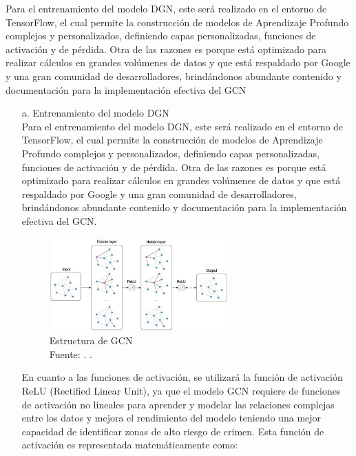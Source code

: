 Para el entrenamiento del modelo DGN, este será realizado en el entorno de TensorFlow, el cual permite la construcción de modelos de Aprendizaje Profundo complejos y personalizados, definiendo capas personalizadas, funciones de activación y de pérdida. Otra de las razones es porque está optimizado para realizar cálculos en grandes volúmenes de datos y que está respaldado por Google y una gran comunidad de desarrolladores, brindándonos abundante contenido y documentación para la implementación efectiva del GCN
\begin{itemize}
	\item[a.] Entrenamiento del modelo DGN \\
	
Para el entrenamiento del modelo DGN, este será realizado en el entorno de TensorFlow, el cual permite la construcción de modelos de Aprendizaje Profundo complejos y personalizados, definiendo capas personalizadas, funciones de activación y de pérdida. Otra de las razones es porque está optimizado para realizar cálculos en grandes volúmenes de datos y que está respaldado por Google y una gran comunidad de desarrolladores, brindándonos abundante contenido y documentación para la implementación efectiva del GCN.
\medskip

\begin{figure}[h]
	\begin{center}
		\includegraphics[width=0.65\textwidth]{3/figures/estru.jpg}
		\caption[Estructura de GCN]{Estructura de GCN\\
			Fuente: \citep*{gl_aisummer}. .}
		\label{1:fig}
	\end{center}
\end{figure}
\medskip

En cuanto a las funciones de activación, se utilizará la función de activación ReLU (Rectified Linear Unit), ya que el modelo GCN requiere de funciones de activación no lineales para aprender y modelar las relaciones complejas entre los datos y mejora el rendimiento del modelo teniendo una mejor capacidad de identificar zonas de alto riesgo de crimen. Esta función de activación es representada matemáticamente como:


\end{itemize}
